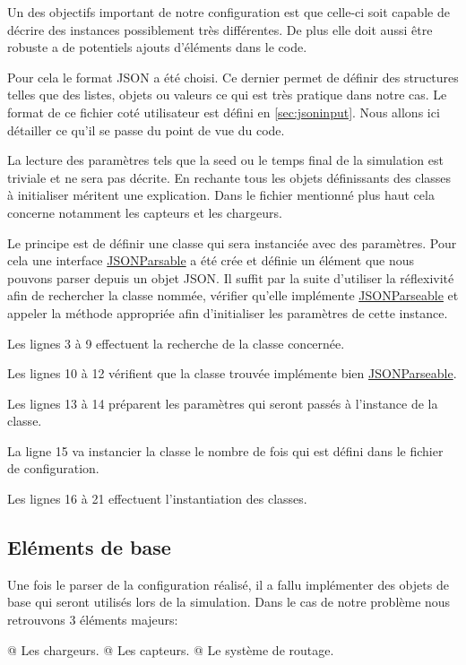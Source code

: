 \documentclass[final]{polytech/polytech}
\newcommand{\klass}[1]{\hyperref[class:#1]{#1}}
\begin{document}
				Un des objectifs important de notre configuration est que celle-ci soit capable de décrire des instances possiblement très différentes.
				De plus elle doit aussi être robuste a de potentiels ajouts d'éléments dans le code.
				
				Pour cela le format JSON a été choisi.
				Ce dernier permet de définir des structures telles que des listes, objets ou valeurs ce qui est très pratique dans notre cas.
				Le format de ce fichier coté utilisateur est défini en \autoref{sec:jsoninput}. Nous allons ici détailler ce qu'il se passe du point de vue du code.
				
				La lecture des paramètres tels que la seed ou le temps final de la simulation est triviale et ne sera pas décrite. 
				En rechante tous les objets définissants des classes à initialiser méritent une explication.
				Dans le fichier mentionné plus haut cela concerne notamment les capteurs et les chargeurs.
				
				Le principe est de définir une classe qui sera instanciée avec des paramètres.
				Pour cela une interface \klass{JSONParsable} a été crée et définie un élément que nous pouvons parser depuis un objet JSON.
				Il suffit par la suite d'utiliser la réflexivité afin de rechercher la classe nommée, vérifier qu'elle implémente \klass{JSONParseable} et appeler la méthode appropriée afin d'initialiser les paramètres de cette instance.
				
				
				Les lignes 3 à 9 effectuent la recherche de la classe concernée.
				
				Les lignes 10 à 12 vérifient que la classe trouvée implémente bien \klass{JSONParseable}.
				
				Les lignes 13 à 14 préparent les paramètres qui seront passés à l'instance de la classe.
				
				La ligne 15 va instancier la classe le nombre de fois qui est défini dans le fichier de configuration.
				
				Les lignes 16 à 21 effectuent l'instantiation des classes.
				
			\subsection{Eléments de base}
				Une fois le parser de la configuration réalisé, il a fallu implémenter des objets de base qui seront utilisés lors de la simulation.
				Dans le cas de notre problème nous retrouvons 3 éléments majeurs:
				\begin{easylist}
					@ Les chargeurs.
					@ Les capteurs.
					@ Le système de routage.
				\end{easylist}
				
\end{document}
